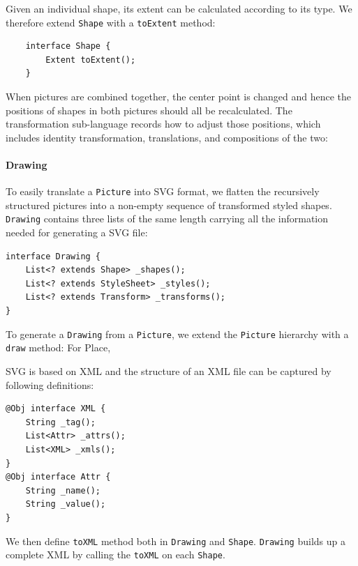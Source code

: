 Given an individual shape, its extent can be calculated according to its type.
We therefore extend \texttt{Shape} with a \texttt{toExtent} method:

\begin{lstlisting}
    interface Shape {
        Extent toExtent();
    }
\end{lstlisting}

When pictures are combined together, the center point is changed and hence the
positions of shapes in both pictures should all be recalculated.
The transformation sub-language records how to adjust those positions,
which includes identity transformation, translations, and compositions of the two:


\paragraph{Drawing}
To easily translate a \texttt{Picture} into SVG format, we flatten the recursively structured pictures into a non-empty
sequence of transformed styled shapes.
\texttt{Drawing} contains three lists of the same length carrying all the
information needed for generating a SVG file:

\begin{lstlisting}
interface Drawing {
    List<? extends Shape> _shapes();
    List<? extends StyleSheet> _styles();
    List<? extends Transform> _transforms();
}
\end{lstlisting}

To generate a \texttt{Drawing} from a \texttt{Picture}, we extend the
\texttt{Picture} hierarchy with a \texttt{draw} method:
For Place,



SVG is based on XML and the structure of an XML file can be captured by following definitions:
\begin{lstlisting}
@Obj interface XML {
    String _tag();
    List<Attr> _attrs();
    List<XML> _xmls();
}
@Obj interface Attr {
    String _name();
    String _value();
}
\end{lstlisting}
We then define \texttt{toXML} method both in \texttt{Drawing} and \texttt{Shape}.
\texttt{Drawing} builds up a complete XML by calling the \texttt{toXML} on each
\texttt{Shape}.

